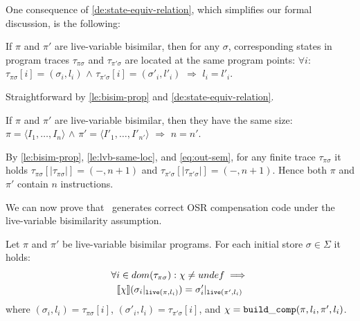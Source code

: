 \noindent One consequence of \ref{de:state-equiv-relation}, which simplifies our formal discussion, is the following:

\begin{lemma}
\label{le:lvb-same-loc}
If $\pi$ and $\pi'$ are live-variable bisimilar, then for any $\sigma$, corresponding states in program traces $\tau_{\pi\sigma}$ and $\tau_{\pi'\sigma}$ are located at the same program points: $\forall i:$ $\tau_{\pi\sigma}[i]=(\sigma_i, l_i)$ $\wedge$ $\tau_{\pi'\sigma}[i]=(\sigma'_i, l'_i)$ $\Longrightarrow$ $l_i=l'_i$.
\end{lemma}
\begin{myproof}
Straightforward by \ref{le:bisim-prop} and \ref{de:state-equiv-relation}.
\end{myproof}

\begin{corollary}
\label{co:same-size}
If $\pi$ and $\pi'$ are live-variable bisimilar, then they have the same size: $\pi=\langle I_1,\ldots,I_n\rangle$ $\wedge$ $\pi'=\langle I'_1,\ldots,I'_{n'}\rangle$ $\Longrightarrow$ $n=n'$.
\end{corollary}
\begin{myproof}
By \ref{le:bisim-prop}, \ref{le:lvb-same-loc}, and \eqref{eq:out-sem}, for any finite trace $\tau_{\pi\sigma}$ it holds $\tau_{\pi\sigma}[|\tau_{\pi\sigma}|]=(-,n+1)$ and $\tau_{\pi'\sigma}[|\tau_{\pi'\sigma}|]=(-,n+1)$. Hence both $\pi$ and $\pi'$ contain $n$ instructions.
\end{myproof}

\noindent We can now prove that \buildcomp\ generates correct OSR compensation code under the live-variable bisimilarity assumption.

\begin{lemma}
\label{le:build-comp-corr}
Let $\pi$ and $\pi'$ be live-variable bisimilar programs. For each initial store $\sigma\in \Sigma$ it holds:
\begin{gather*}
\forall i\in dom(\tau_{\pi\sigma}): \chi\neq undef \implies \\
\mysem{\chi}(\sigma_i\vert_{\live(\pi,l_i)}) = \sigma'_i\vert_{\live(\pi',l_i)}
\end{gather*}
where $(\sigma_i,l_i)=\tau_{\pi\sigma}[i]$, $(\sigma'_i,l_i)=\tau_{\pi'\sigma}[i]$, and $\chi={\tt build\_comp}(\pi,l_i,\pi',l_i)$.
\end{lemma}

